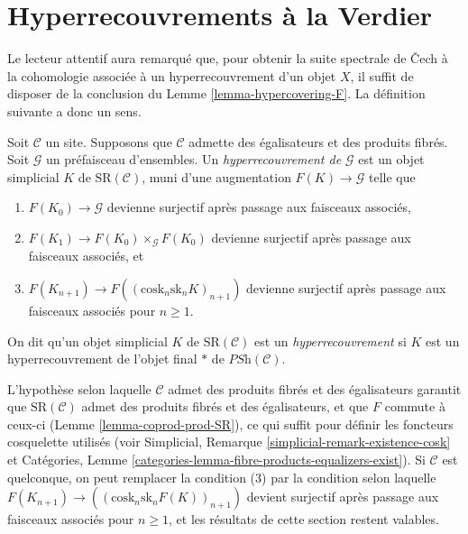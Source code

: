 \section{Hyperrecouvrements à la Verdier}
\label{section-hypercoverings-verdier}

\noindent
Le lecteur attentif aura remarqué que, pour obtenir
la suite spectrale de {\v C}ech à la cohomologie associée à un
hyperrecouvrement d'un objet $X$, il suffit de disposer de la
conclusion du Lemme \ref{lemma-hypercovering-F}.
La définition suivante a donc un sens.

\begin{definition}
\label{definition-hypercovering-variant}
Soit $\mathcal{C}$ un site. Supposons que $\mathcal{C}$ admette des égalisateurs
et des produits fibrés. Soit $\mathcal{G}$ un préfaisceau d'ensembles.
Un {\it hyperrecouvrement de $\mathcal{G}$} est un objet simplicial
$K$ de $\text{SR}(\mathcal{C})$, muni d'une augmentation
$F(K) \to \mathcal{G}$ telle que
\begin{enumerate}
\item $F(K_0) \to \mathcal{G}$ devienne surjectif
après passage aux faisceaux associés,
\item $F(K_1) \to F(K_0) \times_\mathcal{G} F(K_0)$
devienne surjectif après passage aux faisceaux associés, et
\item $F(K_{n + 1}) \longrightarrow F((\text{cosk}_n \text{sk}_n K)_{n + 1})$
devienne surjectif après passage aux faisceaux associés pour $n \geq 1$.
\end{enumerate}
On dit qu'un objet simplicial $K$ de $\text{SR}(\mathcal{C})$
est un {\it hyperrecouvrement} si $K$ est un hyperrecouvrement de l'objet
final $*$ de $\textit{PSh}(\mathcal{C})$.
\end{definition}

\noindent
L'hypothèse selon laquelle $\mathcal{C}$ admet des produits fibrés et des égalisateurs
garantit que $\text{SR}(\mathcal{C})$ admet des produits fibrés
et des égalisateurs, et que $F$ commute à ceux-ci
(Lemme \ref{lemma-coprod-prod-SR}), ce qui suffit
pour définir les foncteurs cosquelette utilisés (voir
Simplicial, Remarque \ref{simplicial-remark-existence-cosk} et
Catégories, Lemme \ref{categories-lemma-fibre-products-equalizers-exist}).
Si $\mathcal{C}$ est quelconque, on peut remplacer la condition (3) par la
condition selon laquelle
$F(K_{n + 1}) \longrightarrow ((\text{cosk}_n \text{sk}_n F(K))_{n + 1})$
devient surjectif après passage aux faisceaux associés pour $n \geq 1$, et les
résultats de cette section restent valables.

